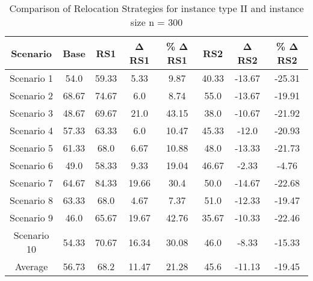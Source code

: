 \begin{table}[H]
\centering
\begin{tabular}{cccccccc}
  \hline
  \textbf{Scenario} & \textbf{Base} & \textbf{RS1} & \textbf{Δ RS1} & \textbf{\% Δ RS1} & \textbf{RS2} & \textbf{Δ RS2} & \textbf{\% Δ RS2} \\\hline
  Scenario 1 & 54.0 & 59.33 & 5.33 & 9.87 & 40.33 & -13.67 & -25.31 \\
  Scenario 2 & 68.67 & 74.67 & 6.0 & 8.74 & 55.0 & -13.67 & -19.91 \\
  Scenario 3 & 48.67 & 69.67 & 21.0 & 43.15 & 38.0 & -10.67 & -21.92 \\
  Scenario 4 & 57.33 & 63.33 & 6.0 & 10.47 & 45.33 & -12.0 & -20.93 \\
  Scenario 5 & 61.33 & 68.0 & 6.67 & 10.88 & 48.0 & -13.33 & -21.73 \\
  Scenario 6 & 49.0 & 58.33 & 9.33 & 19.04 & 46.67 & -2.33 & -4.76 \\
  Scenario 7 & 64.67 & 84.33 & 19.66 & 30.4 & 50.0 & -14.67 & -22.68 \\
  Scenario 8 & 63.33 & 68.0 & 4.67 & 7.37 & 51.0 & -12.33 & -19.47 \\
  Scenario 9 & 46.0 & 65.67 & 19.67 & 42.76 & 35.67 & -10.33 & -22.46 \\
  Scenario 10 & 54.33 & 70.67 & 16.34 & 30.08 & 46.0 & -8.33 & -15.33 \\
  Average & 56.73 & 68.2 & 11.47 & 21.28 & 45.6 & -11.13 & -19.45 \\\hline
\end{tabular}
\caption{Comparison of Relocation Strategies for instance type II and instance size n = 300}
\label{tab:wait:resrelocation-comparison_II_300}
\end{table}
